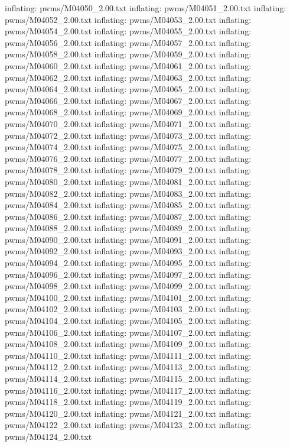 \documentclass[letterpaper,10pt,english]{sphinxmanual}
\begin{document}
{\begin{sphinxVerbatim}[commandchars=\\\{\}]
  inflating: pwms/M04050\_2.00.txt
  inflating: pwms/M04051\_2.00.txt
  inflating: pwms/M04052\_2.00.txt
  inflating: pwms/M04053\_2.00.txt
  inflating: pwms/M04054\_2.00.txt
  inflating: pwms/M04055\_2.00.txt
  inflating: pwms/M04056\_2.00.txt
  inflating: pwms/M04057\_2.00.txt
  inflating: pwms/M04058\_2.00.txt
  inflating: pwms/M04059\_2.00.txt
  inflating: pwms/M04060\_2.00.txt
  inflating: pwms/M04061\_2.00.txt
  inflating: pwms/M04062\_2.00.txt
  inflating: pwms/M04063\_2.00.txt
  inflating: pwms/M04064\_2.00.txt
  inflating: pwms/M04065\_2.00.txt
  inflating: pwms/M04066\_2.00.txt
  inflating: pwms/M04067\_2.00.txt
  inflating: pwms/M04068\_2.00.txt
  inflating: pwms/M04069\_2.00.txt
  inflating: pwms/M04070\_2.00.txt
  inflating: pwms/M04071\_2.00.txt
  inflating: pwms/M04072\_2.00.txt
  inflating: pwms/M04073\_2.00.txt
  inflating: pwms/M04074\_2.00.txt
  inflating: pwms/M04075\_2.00.txt
  inflating: pwms/M04076\_2.00.txt
  inflating: pwms/M04077\_2.00.txt
  inflating: pwms/M04078\_2.00.txt
  inflating: pwms/M04079\_2.00.txt
  inflating: pwms/M04080\_2.00.txt
  inflating: pwms/M04081\_2.00.txt
  inflating: pwms/M04082\_2.00.txt
  inflating: pwms/M04083\_2.00.txt
  inflating: pwms/M04084\_2.00.txt
  inflating: pwms/M04085\_2.00.txt
  inflating: pwms/M04086\_2.00.txt
  inflating: pwms/M04087\_2.00.txt
  inflating: pwms/M04088\_2.00.txt
  inflating: pwms/M04089\_2.00.txt
  inflating: pwms/M04090\_2.00.txt
  inflating: pwms/M04091\_2.00.txt
  inflating: pwms/M04092\_2.00.txt
  inflating: pwms/M04093\_2.00.txt
  inflating: pwms/M04094\_2.00.txt
  inflating: pwms/M04095\_2.00.txt
  inflating: pwms/M04096\_2.00.txt
  inflating: pwms/M04097\_2.00.txt
  inflating: pwms/M04098\_2.00.txt
  inflating: pwms/M04099\_2.00.txt
  inflating: pwms/M04100\_2.00.txt
  inflating: pwms/M04101\_2.00.txt
  inflating: pwms/M04102\_2.00.txt
  inflating: pwms/M04103\_2.00.txt
  inflating: pwms/M04104\_2.00.txt
  inflating: pwms/M04105\_2.00.txt
  inflating: pwms/M04106\_2.00.txt
  inflating: pwms/M04107\_2.00.txt
  inflating: pwms/M04108\_2.00.txt
  inflating: pwms/M04109\_2.00.txt
  inflating: pwms/M04110\_2.00.txt
  inflating: pwms/M04111\_2.00.txt
  inflating: pwms/M04112\_2.00.txt
  inflating: pwms/M04113\_2.00.txt
  inflating: pwms/M04114\_2.00.txt
  inflating: pwms/M04115\_2.00.txt
  inflating: pwms/M04116\_2.00.txt
  inflating: pwms/M04117\_2.00.txt
  inflating: pwms/M04118\_2.00.txt
  inflating: pwms/M04119\_2.00.txt
  inflating: pwms/M04120\_2.00.txt
  inflating: pwms/M04121\_2.00.txt
  inflating: pwms/M04122\_2.00.txt
  inflating: pwms/M04123\_2.00.txt
  inflating: pwms/M04124\_2.00.txt

\end{sphinxVerbatim}}
\end{document}
